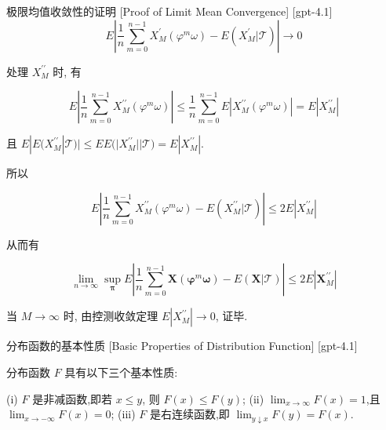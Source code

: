 \documentclass[UTF8]{ctexart}
\begin{document}
    
    
    \begin{prf}
        {极限均值收敛性的证明}
        [Proof of Limit Mean Convergence]
        [gpt-4.1]
        \[
E \left| \frac { 1 } { n } \sum _ { m = 0 } ^ { n - 1 } X _ { M } ^ { \prime } ( \varphi ^ { m } \omega ) - E ( X _ { M } ^ { \prime } | \mathcal { T } ) \right| \to 0
\]

处理 $X _ { M } ^ { \prime \prime }$ 时, 有

\[
E \left| \frac { 1 } { n } \sum _ { m = 0 } ^ { n - 1 } X _ { M } ^ { \prime \prime } ( \varphi ^ { m } \omega ) \right| \leq \frac { 1 } { n } \sum _ { m = 0 } ^ { n - 1 } E | X _ { M } ^ { \prime \prime } ( \varphi ^ { m } \omega ) | = E | X _ { M } ^ { \prime \prime } |
\]

且 $E | E ( X _ { M } ^ { \prime \prime } | \mathcal { T } ) | \leq E E ( | X _ { M } ^ { \prime \prime } | | \mathcal { T } ) = E | X _ { M } ^ { \prime \prime } |$.

所以

\[
E \left| \frac { 1 } { n } \sum _ { m = 0 } ^ { n - 1 } X _ { M } ^ { \prime \prime } ( \varphi ^ { m } \omega ) - E ( X _ { M } ^ { \prime \prime } | \mathcal { T } ) \right| \leq 2 E | X _ { M } ^ { \prime \prime } |
\]

从而有

\[
\lim _ { n \to \infty } \sup _ { \boldsymbol { \pi } } E \left| \frac { 1 } { n } \sum _ { m = 0 } ^ { n - 1 } \boldsymbol { X } ( \boldsymbol { \varphi } ^ { m } \boldsymbol { \omega } ) - E ( \boldsymbol { X } | \mathcal { T } ) \right| \leq 2 E | \boldsymbol { X } _ { M } ^ { \prime \prime } |
\]

当 $M \to \infty$ 时, 由控测收敛定理 $E | X _ { M } ^ { \prime \prime } | \to 0$, 证毕.

    \end{prf}
    
    
    
    \begin{ppt}
        {分布函数的基本性质}
        [Basic Properties of Distribution Function]
        [gpt-4.1]
        
分布函数 $F$ 具有以下三个基本性质:

(i) $F$ 是非减函数,即若 $x \leq y$, 则 $F(x) \leq F(y)$;
(ii) $\lim_{x \to \infty} F(x) = 1$,且 $\lim_{x \to -\infty} F(x) = 0$;
(iii) $F$ 是右连续函数,即 $\lim_{y \downarrow x} F(y) = F(x)$.

    \end{ppt}
    
\end{document}
